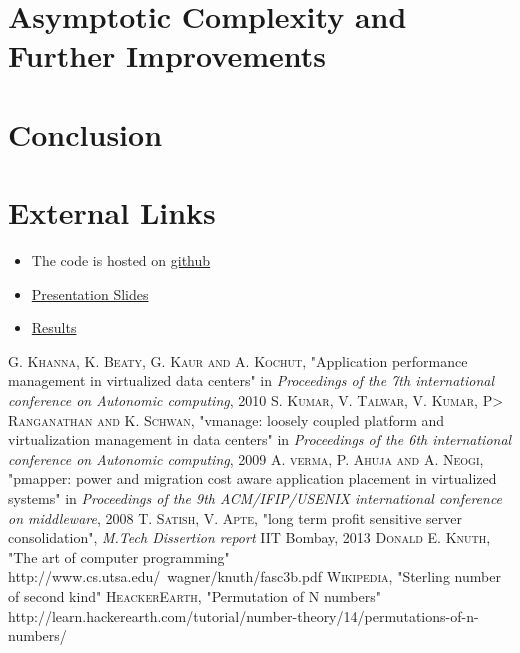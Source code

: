 \documentclass[a4paper,12pt]{article}
\begin{document}
\section{Asymptotic Complexity and Further Improvements}

\section{Conclusion}

\section{External Links}
\begin{itemize}
\item The code is hosted on  \href{https://github.com/mangalaman93/simcon}{github}
\item \href{https://docs.google.com/presentation/d/1o9QjOCgkjpc1pTfe9yfQ9EgXF5nRbf4Yh9lMTVCrav4/edit#slide=id.g11d5b1618_0202}{Presentation Slides}
\item \href{https://docs.google.com/spreadsheet/ccc?key=0Aoq3-tdSgQ83dGEzakJoUk9pYjlmSXVNN3p1bGtwLWc&usp=drive_web#gid=0}{Results}
\end{itemize}

\begin{thebibliography}{9}
    \textsc{G. Khanna, K. Beaty, G. Kaur and A. Kochut}, "Application performance management in virtualized data centers" in \textit{Proceedings of the 7th international conference on Autonomic computing}, 2010
    \textsc{S. Kumar, V. Talwar, V. Kumar, P> Ranganathan and K. Schwan}, "vmanage: loosely coupled platform and virtualization management in data centers" in \textit{Proceedings of the 6th international conference on Autonomic computing}, 2009
    \textsc{A. verma, P. Ahuja and A. Neogi}, "pmapper: power and migration cost aware application placement in virtualized systems" in \textit{Proceedings of the 9th ACM/IFIP/USENIX international conference on middleware}, 2008
    \textsc{T. Satish, V. Apte}, "long term profit sensitive server consolidation", \textit{M.Tech Dissertion report} IIT Bombay, 2013
    \textsc{Donald E. Knuth}, "The art of computer programming" http://www.cs.utsa.edu/~wagner/knuth/fasc3b.pdf
    \textsc{Wikipedia}, "Sterling number of second kind"
    \textsc{HeackerEarth}, "Permutation of N numbers" http://learn.hackerearth.com/tutorial/number-theory/14/permutations-of-n-numbers/
\end{thebibliography}
\end{document}
